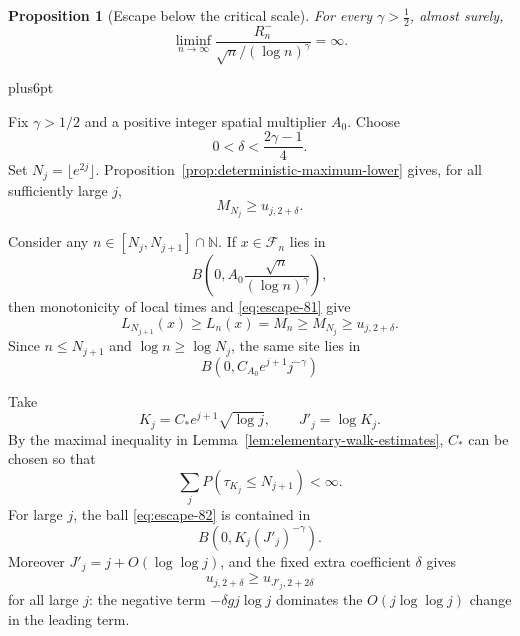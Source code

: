 \documentclass[12pt,reqno]{amsart}
\makeatletter
\theoremstyle{plain}
\newtheorem{proposition}[theorem]{Proposition}
\theoremstyle{definition}
\theoremstyle{remark}
\renewenvironment{proof}[1][\proofname]{%
  \par
  \pushQED{\qed}%
  \normalfont
  \topsep6pt plus6pt\relax
  \trivlist
  \item[\hskip\labelsep\slshape #1\@addpunct{.}]%
  \ignorespaces
}{%
  \popQED
  \endtrivlist
  \@endpefalse
}
\DeclareRobustCommand{\qed}{%
  \leavevmode\unskip\penalty9999\hbox{}\nobreak
  \ifmmode
    \makebox[0pt][l]{\qquad\hbox{\qedsymbol}}%
  \else
    \qquad\hbox{\qedsymbol}%
  \fi
}
\renewcommand{\qedsymbol}{\rule[.47pt]{4pt}{6pt}}
\numberwithin{equation}{section}
\makeatother
\begin{document}
\begin{proposition}[Escape below the critical scale]\label{prop:supercritical-escape}
For every \(\gamma>\tfrac12\), almost surely,
\begin{equation}
\liminf_{n\to\infty}
       \frac{R_n^-}{\sqrt n/(\log n)^\gamma}=\infty.          \label{eq:escape-80}
\end{equation}
\end{proposition}

\begin{proof}
Fix \(\gamma>1/2\) and a positive integer spatial multiplier \(A_0\).
Choose
\[
       0<\delta<\frac{2\gamma-1}{4}.
\]
Set \(N_j=\lfloor e^{2j}\rfloor\).
Proposition~\ref{prop:deterministic-maximum-lower} gives, for all
sufficiently large \(j\),
\begin{equation}
M_{N_j}\ge u_{j,2+\delta}.                             \label{eq:escape-81}
\end{equation}

Consider any \(n\in[N_j,N_{j+1}]\cap\mathbb N\). If
\(x\in\mathcal F_n\) lies in
\[
       B\left(0,A_0\frac{\sqrt n}{(\log n)^\gamma}\right),
\]
then monotonicity of local times and \eqref{eq:escape-81} give
\[
 L_{N_{j+1}}(x)\ge L_n(x)=M_n\ge M_{N_j}
       \ge u_{j,2+\delta}.
\]
Since \(n\le N_{j+1}\) and \(\log n\ge\log N_j\), the same site lies in
\begin{equation}
B\left(0,C_{A_0}e^{j+1}j^{-\gamma}\right)             \label{eq:escape-82}
\end{equation}

Take
\[
       K_j=C_*e^{j+1}\sqrt{\log j},\qquad J'_j=\log K_j.
\]
By the maximal inequality in Lemma~\ref{lem:elementary-walk-estimates}, \(C_*\)
can be chosen so that
\begin{equation}
\sum_jP(\tau_{K_j}\le N_{j+1})<\infty.                 \label{eq:escape-83}
\end{equation}
For large \(j\), the ball \eqref{eq:escape-82} is contained in
\[
       B(0,K_j(J'_j)^{-\gamma}).
\]
Moreover \(J'_j=j+O(\log\log j)\), and the fixed extra coefficient
\(\delta\) gives
\begin{equation}
u_{j,2+\delta}\ge u_{J'_j,2+2\delta}                  \label{eq:escape-84}
\end{equation}
for all large \(j\): the negative term
\(-\delta g j\log j\) dominates the \(O(j\log\log j)\) change in the
leading term.


\end{proof}
\end{document}
